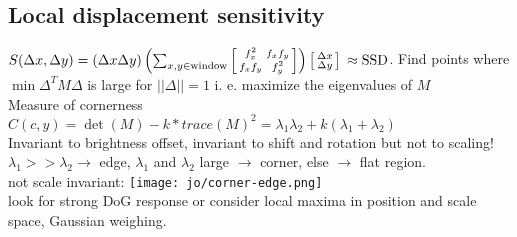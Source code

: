 \subsection*{Local displacement sensitivity }
$S (\Delta x, \Delta y) = (\Delta x \Delta y) \left( \sum_{x, y \in \text{window}}
\begin{bmatrix}
    \begin{smallmatrix} 
        f_x^{2} & f_x f_y \\ 
        f_x f_y & f_y^{2} 
    \end{smallmatrix} 
\end{bmatrix}
\right)
\begin{bmatrix}
    \begin{smallmatrix} 
        \Delta x \\ 
        \Delta y
    \end{smallmatrix} 
\end{bmatrix}  \\
\approx \text{SSD}$.
Find points where $\min \Delta^T M \Delta$ is large for $||\Delta || = 1$ i. e. maximize the eigenvalues of $M$\\
 Measure of cornerness\\
$C(c, y) = \det(M) - k * trace(M)^{2} = \lambda_1\lambda_2 + k(\lambda_1 + \lambda_2)$ \\
 Invariant to brightness offset, invariant to shift and rotation but not to scaling!
$\lambda_1 >> \lambda_2 \rightarrow$ edge, $\lambda_1$ and $ \lambda_2$ large $\rightarrow$ corner, else $\rightarrow$ flat region.\\
not scale invariant: \texttt{[image: jo/corner-edge.png]}\\
 look for strong DoG response or consider local maxima in position and scale space, Gaussian weighing.
